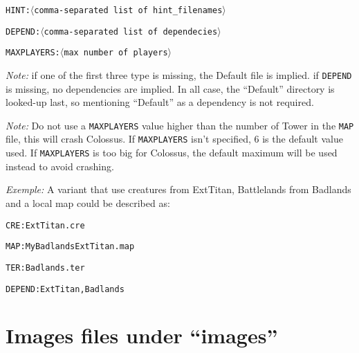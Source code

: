\documentclass{article}
\begin{document}
\texttt{\texttt{HINT}:$\langle$comma-separated list of hint\_filenames$\rangle$}

\texttt{\texttt{DEPEND}:$\langle$comma-separated list of dependecies$\rangle$}

\texttt{\texttt{MAXPLAYERS}:$\langle$max number of players$\rangle$}

\textit{Note:} if one of the  first three type is missing, the Default file is implied. if \texttt{DEPEND} is missing, no dependencies are implied. In all case, the ``Default'' directory is looked-up last, so mentioning ``Default'' as a dependency is not required.

\textit{Note:} Do not use a \texttt{MAXPLAYERS} value higher than the number of Tower in the \texttt{MAP} file, this will crash Colossus. If \texttt{MAXPLAYERS} isn't specified, 6 is the default value used. If \texttt{MAXPLAYERS} is too big for Colossus, the default maximum will be used instead to avoid crashing.

\textit{Exemple:} A variant that use creatures from ExtTitan, Battlelands from Badlands and a local map could be described as:

\texttt{\texttt{CRE}:ExtTitan.cre}

\texttt{\texttt{MAP}:MyBadlandsExtTitan.map}

\texttt{\texttt{TER}:Badlands.ter}

\texttt{\texttt{DEPEND}:ExtTitan,Badlands}

\section{Images files under ``images''}
\label{images}
\end{document}
